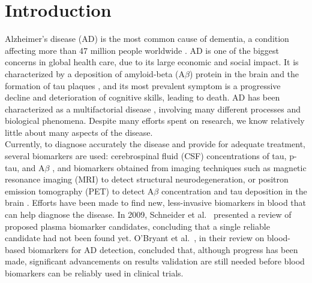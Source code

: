 
\section{Introduction}

Alzheimer's disease (AD) is the most common cause of dementia, a condition affecting more than 47 million people worldwide \cite{AlzheimersAssociation}. AD is one of the biggest concerns in global health care, due to its large economic and social impact. It is characterized by a deposition of amyloid-beta (A$\beta$) protein in the brain and the formation of tau plaques \cite{Jack2018}, and its most prevalent symptom is a progressive decline and deterioration of cognitive skills, leading to death. AD has been characterized as a multifactorial disease \cite{Jack2013,Jack2018}, involving many different processes and biological phenomena. Despite many efforts spent on research, we know relatively little about many aspects of the disease. \\

Currently, to diagnose accurately the disease and provide for adequate treatment, several biomarkers are used: cerebrospinal fluid (CSF) concentrations of tau, p-tau, and A$\beta$ \cite{Andreasen1999}, and biomarkers obtained from imaging techniques such as magnetic resonance imaging (MRI) to detect structural neurodegeneration, or positron emission tomography (PET) to detect A$\beta$ concentration and tau deposition in the brain \cite{Weiner2005,Clark2011}. Efforts have been made to find new, less-invasive biomarkers in blood that can help diagnose the disease. In 2009, Schneider et al.\ \cite{Schneider2009} presented a review of proposed plasma biomarker candidates, concluding that a single reliable candidate had not been found yet. O'Bryant et al.\ \cite{Obryant}, in their review on blood-based biomarkers for AD detection, concluded that, although progress has been made, significant advancements on results validation are still needed before blood biomarkers can be reliably used in clinical trials. \\


